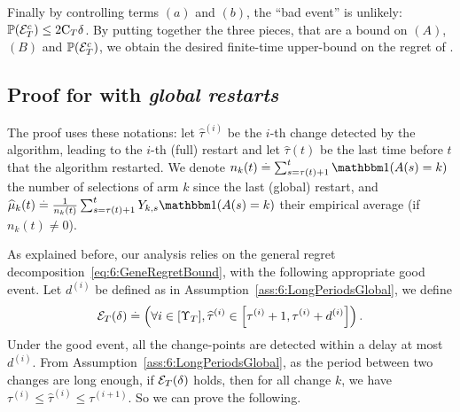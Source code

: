 Finally by controlling terms $(a)$ and $(b)$, the ``bad event'' is unlikely: $\mathbb{P}(\mathcal{E}_T^c) \leq 2\mathrm{C}_T \delta$.
By putting together the three pieces, that are a bound on $(A)$, $(B)$ and $\mathbb{P}(\mathcal{E}_T^c)$, we obtain the desired finite-time upper-bound on the regret of \GLRklUCB.





\subsection{Proof for \GLRklUCB{} with \emph{global restarts}}
\label{proof:6:mainRegretBoundGlobal}





The proof uses these notations:
let $\widehat{\tau}^{(i)}$ be the $i$-th change detected by the algorithm, leading to the $i$-th (full) restart and let $\widehat{\tau}(t)$ be the last time before $t$ that the algorithm restarted.
We denote $n_k(t) \eqdef \sum_{s=\tau(t)+1}^{t}\indic(A(s) = k)$ the number of selections of arm $k$ since the last (global) restart, and $\widehat{\mu}_k(t) \eqdef \frac{1}{n_k(t)}\sum_{s=\tau(t)+1}^{t}Y_{k,s}\indic(A(s) = k)$ their empirical average (if $n_k(t) \neq 0$).

As explained before, our analysis relies on the general regret decomposition~\eqref{eq:6:GeneRegretBound}, with the following appropriate good event. Let $d^(i)$ be defined as in Assumption~\ref{ass:6:LongPeriodsGlobal}, we define
\begin{equation}\label{def:6:GoodEvenGlobal}
    \mathcal{E}_T(\delta) \overset{.}{=} \left( \forall i \in [\Upsilon_T], \widehat{\tau}^{(i)} \in \left[\tau^{(i)} + 1, \tau^{(i)} + d^{(i)}\right] \right).
\end{equation}
Under the good event, all the change-points are detected within a delay at most $d^{(i)}$.
%
From Assumption~\ref{ass:6:LongPeriodsGlobal}, as the period between two changes are long enough, if $\mathcal{E}_T(\delta)$ holds, then for all change $k$, we have $\tau^{(i)} \leq \widehat{\tau}^{(i)} \leq \tau^{(i+1)}$.
So we can prove the following.

